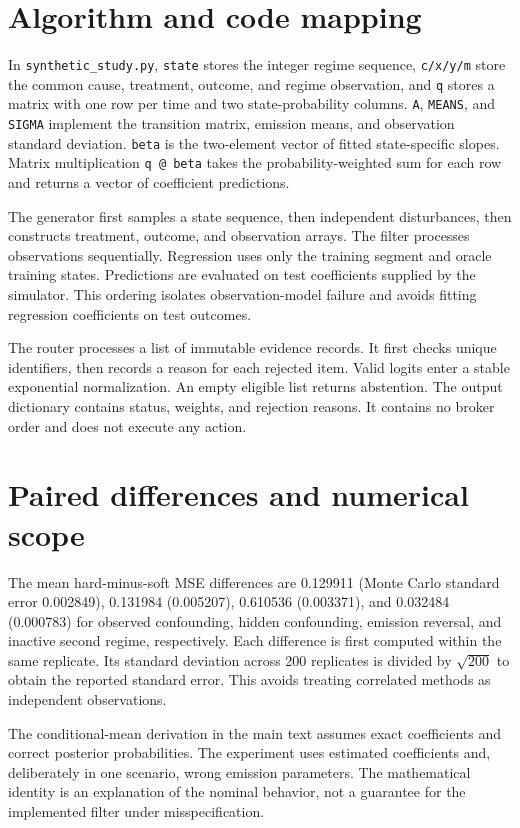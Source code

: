 \section{Algorithm and code mapping}
In \texttt{synthetic\_study.py}, \texttt{state} stores the integer regime sequence, \texttt{c/x/y/m} store the common cause, treatment, outcome, and regime observation, and \texttt{q} stores a matrix with one row per time and two state-probability columns. \texttt{A}, \texttt{MEANS}, and \texttt{SIGMA} implement the transition matrix, emission means, and observation standard deviation. \texttt{beta} is the two-element vector of fitted state-specific slopes. Matrix multiplication \texttt{q @ beta} takes the probability-weighted sum for each row and returns a vector of coefficient predictions.

The generator first samples a state sequence, then independent disturbances, then constructs treatment, outcome, and observation arrays. The filter processes observations sequentially. Regression uses only the training segment and oracle training states. Predictions are evaluated on test coefficients supplied by the simulator. This ordering isolates observation-model failure and avoids fitting regression coefficients on test outcomes.

The router processes a list of immutable evidence records. It first checks unique identifiers, then records a reason for each rejected item. Valid logits enter a stable exponential normalization. An empty eligible list returns abstention. The output dictionary contains status, weights, and rejection reasons. It contains no broker order and does not execute any action.

\section{Paired differences and numerical scope}
The mean hard-minus-soft MSE differences are 0.129911 (Monte Carlo standard error 0.002849), 0.131984 (0.005207), 0.610536 (0.003371), and 0.032484 (0.000783) for observed confounding, hidden confounding, emission reversal, and inactive second regime, respectively. Each difference is first computed within the same replicate. Its standard deviation across 200 replicates is divided by $\sqrt{200}$ to obtain the reported standard error. This avoids treating correlated methods as independent observations.

The conditional-mean derivation in the main text assumes exact coefficients and correct posterior probabilities. The experiment uses estimated coefficients and, deliberately in one scenario, wrong emission parameters. The mathematical identity is an explanation of the nominal behavior, not a guarantee for the implemented filter under misspecification.

